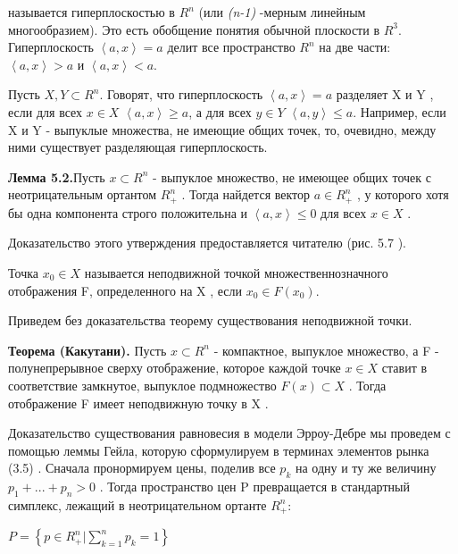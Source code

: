 \documentclass[12pt, 4paper]{book}
\begin{document}
{называется гиперплоскостью в $R^{n}$ (или \textit{(n-1)} -мерным линейным многообразием). Это есть обобщение понятия обычной плоскости в  $R^3$. Гиперплоскость $\left\langle a,x \right\rangle = a$ делит все пространство $R^n$ на две части: $\left\langle  a,x\right\rangle >a$  и $\left\langle  a,x\right\rangle <a$.
\par

Пусть $X,Y \subset R^n$. Говорят, что гиперплоскость $\left\langle  a,x\right\rangle = a$ разделяет X и Y , если для всех $x \in X$ $\left\langle  a,x\right\rangle \geq a$, а для всех $y \in Y $ $\left\langle  a,y\right\rangle \leq a$. Например, если X и Y - выпуклые множества, не имеющие общих точек, то, очевидно, между ними существует разделяющая гиперплоскость.
\par

\textbf{Лемма 5.2.}Пусть $x \subset R^n$ - выпуклое множество, не имеющее общих точек с неотрицательным ортантом $R_{+}^n$ . Тогда найдется вектор $a \in R_{+}^n$ , у которого хотя бы одна компонента строго положительна и $\left\langle  a,x \right\rangle \leq 0$ для всех $x \in X$ .
\par

Доказательство этого утверждения предоставляется читателю (рис. 5.7 ). 
\par

Точка $x_0 \in X$ называется неподвижной точкой множественнозначного отображения F, определенного на X , если $x_0 \in F(x_0)$.
\par

Приведем без доказательства теорему существования неподвижной точки.
\par

\textbf{Теорема (Какутани).} Пусть $x \subset R^n$ - компактное, выпуклое множество, а F - полунепрерывное сверху отображение, которое каждой точке $x \in X$ ставит в соответствие замкнутое, выпуклое подмножество $F(x) \subset X$ . Тогда отображение F имеет неподвижную точку в X . 
\par

 Доказательство существования равновесия в модели Эрроу-Дебре мы проведем с помощью леммы Гейла, которую сформулируем в терминах элементов рынка (3.5) . Сначала пронормируем цены, поделив все $p_k$ на одну и ту же величину $p_1+...+p_n > 0$ . Тогда пространство цен P превращается в стандартный симплекс, лежащий в неотрицательном ортанте $R_{+}^n$:
\begin{center}
 $P = \left\{ p \in R_{+}^{n}|\sum\limits_{k=1}^{n}p_k =1 \right\}$
\end{center}
\par

}
\end{document}
